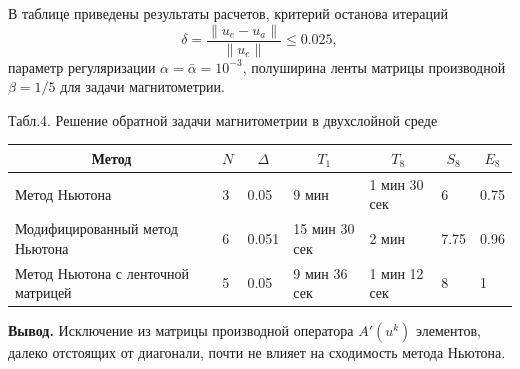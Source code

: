 \documentclass[10pt,pdf, mathserif, hyperref={unicode}]{beamer}
\begin{document}
\begin{frame}
	В таблице приведены результаты расчетов, критерий останова итераций 
	$$\delta=\frac{\|u_e-u_a\|}{\|u_e\|}\le 0.025,$$ параметр регуляризации $\alpha=\bar{\alpha}=10^{-3}$, полуширина ленты матрицы производной $\beta=1/5$ для задачи магнитометрии.
	\begin{table}[]
		\centering
		{\scriptsize Табл.4. Решение обратной задачи магнитометрии в двухслойной среде}
		\begin{tabular}{|p{}|p{}|l|l|l|l|l|}
			\hline
			\multicolumn{1}{|c|}{Метод}        & \multicolumn{1}{c|}{$N$} &
			\multicolumn{1}{c|}{$\Delta$} &
			\multicolumn{1}{c|}{$T_1$} & \multicolumn{1}{c|}{$T_8$} &	\multicolumn{1}{c|}{$S_8$}&\multicolumn{1}{c|}{$E_8$} \\ \hline
			Метод Ньютона                      &   3             & 0.05                  &     9 мин                   &      1 мин 30 сек   
			& 6 &        0.75     \\ \hline
			Модифицированный метод Ньютона     &              6           & 0.051           & 15 мин 30 сек                & 2 мин  & 7.75 & 0.96\\ \hline
			Метод Ньютона с ленточной матрицей &   5                    & 0.05               & 9 мин 36 сек    & 1 мин 12 сек & 8 & 1   \\ \hline
		\end{tabular}
	\end{table}
	{\bfseries \large Вывод.} Исключение из матрицы производной оператора $A'(u^k)$ элементов, далеко отстоящих от диагонали, почти не влияет на сходимость метода Ньютона.
\end{frame}
\end{document}
